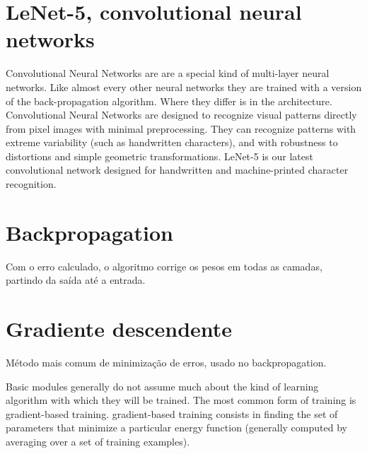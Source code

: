 \documentclass[11pt]{article}
\begin{document}
\section{LeNet-5, convolutional neural networks}
\label{sec-2}

  Convolutional Neural Networks are are a special kind of multi-layer neural networks. Like almost every other neural networks they are trained with a version of the back-propagation algorithm. Where they differ is in the architecture.   
  Convolutional Neural Networks are designed to recognize visual patterns directly from pixel images with minimal preprocessing.  
  They can recognize patterns with extreme variability (such as handwritten characters), and with robustness to distortions and simple geometric transformations.  
  LeNet-5 is our latest convolutional network designed for handwritten and machine-printed character recognition.  
\section{Backpropagation}
\label{sec-3}


  Com o erro calculado, o algoritmo corrige os pesos em todas as camadas, partindo da saída até a entrada.
\section{Gradiente descendente}
\label{sec-4}


  Método mais comum de minimização de erros, usado no backpropagation.

  Basic modules generally do not assume much about the kind of learning algorithm with which they will be trained. The most common form of training is gradient-based training. gradient-based training consists in finding the set of parameters that minimize a particular energy function (generally computed by averaging over a set of training examples).
\end{document}
